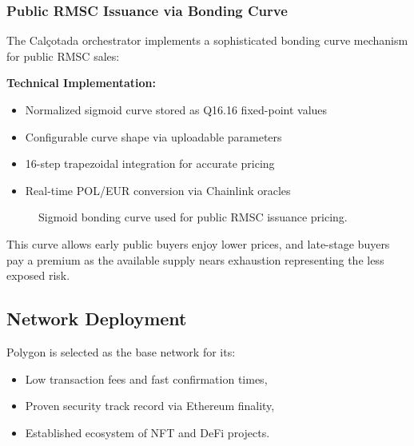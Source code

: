 \documentclass[conference]{IEEEtran}
\begin{document}
\subsubsection{Public RMSC Issuance via Bonding Curve}

The Calçotada orchestrator implements a sophisticated bonding curve mechanism for public RMSC sales:

\textbf{Technical Implementation:}
\begin{itemize}
    \item Normalized sigmoid curve stored as Q16.16 fixed-point values
    \item Configurable curve shape via uploadable parameters
    \item 16-step trapezoidal integration for accurate pricing
    \item Real-time POL/EUR conversion via Chainlink oracles
\end{itemize}


\begin{figure}[ht]
\centering
{}
\caption{Sigmoid bonding curve used for public RMSC issuance pricing.}
\label{fig:sigmoidcurve}
\end{figure}


This curve allows early public buyers enjoy lower prices, and late-stage buyers pay a premium as the available supply nears exhaustion representing the less exposed risk.

\subsection{Network Deployment}
Polygon is selected as the base network for its:
\begin{itemize}
    \item Low transaction fees and fast confirmation times,
    \item Proven security track record via Ethereum finality,
    \item Established ecosystem of NFT and DeFi projects.
\end{itemize}
\end{document}
